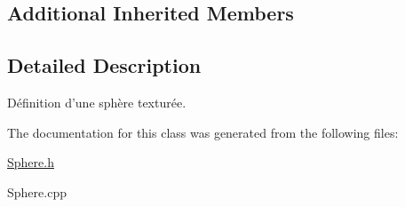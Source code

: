 \subsection*{Additional Inherited Members}


\subsection{Detailed Description}
Définition d'une sphère texturée. 

The documentation for this class was generated from the following files\+:\begin{DoxyCompactItemize}
\item 
\hyperlink{Sphere_8h}{Sphere.\+h}\item 
Sphere.\+cpp\end{DoxyCompactItemize}
